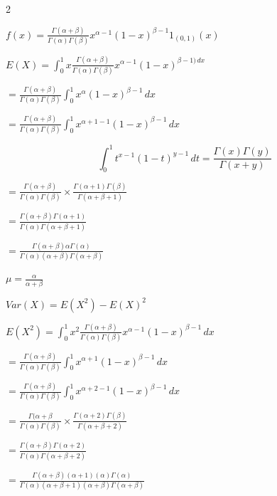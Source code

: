 \documentclass[12 pt]{article}
\begin{document}
    \begin{exercise}{2}
    \hfill

    $f(x) = \frac{\Gamma(\alpha + \beta)}{\Gamma(\alpha) \Gamma(\beta)} x^{\alpha - 1} (1-x)^{\beta - 1} 1_{(0, 1)} (x)$

    $E(X) = \int_{0}^{1} x \frac{\Gamma(\alpha + \beta)}{\Gamma(\alpha) \Gamma(\beta)} x^{\alpha - 1} (1-x)^{\beta - 1) \, dx}$

    $= \frac{\Gamma(\alpha + \beta)}{\Gamma(\alpha) \Gamma(\beta)} \int_{0}^{1} x^{\alpha} (1-x)^{\beta - 1} \, dx$

    $= \frac{\Gamma(\alpha + \beta)}{\Gamma(\alpha) \Gamma(\beta)} \int_{0}^{1} x^{\alpha + 1 - 1} (1-x)^{\beta - 1} \, dx$

    $$\int_{0}^{1} t^{x-1} (1-t)^{y-1} \, dt = \frac{\Gamma(x) \Gamma(y)}{\Gamma(x + y)}$$

    $= \frac{\Gamma(\alpha + \beta)}{\Gamma(\alpha) \Gamma(\beta)} \times \frac{\Gamma(\alpha + 1) \Gamma(\beta)}{\Gamma(\alpha + \beta + 1)}$

    $= \frac{\Gamma(\alpha + \beta) \Gamma(\alpha + 1)}{\Gamma(\alpha) \Gamma(\alpha + \beta + 1)}$

    $= \frac{\Gamma(\alpha + \beta) \alpha \Gamma(\alpha)}{\Gamma(\alpha) (\alpha + \beta) \Gamma(\alpha + \beta)}$

    $\mu = \frac{\alpha}{\alpha + \beta}$

    \hfill

    $Var(X) = E(X^2) - E(X)^2$

    \hfill

    $E(X^2) = \int_{0}^{1} x^2 \frac{\Gamma(\alpha + \beta)}{\Gamma(\alpha) \Gamma(\beta)} x^{\alpha - 1} (1-x)^{\beta -1} \, dx$

    $= \frac{\Gamma(\alpha + \beta)}{\Gamma(\alpha) \Gamma(\beta)} \int_{0}^{1} x^{\alpha + 1} (1-x)^{\beta - 1} \, dx$

    $= \frac{\Gamma(\alpha + \beta)}{\Gamma(\alpha) \Gamma(\beta)} \int_{0}^{1} x^{\alpha + 2 - 1} (1-x)^{\beta - 1} \, dx$

    $= \frac{\Gamma(\alpha + \beta}{\Gamma(\alpha) \Gamma(\beta)} \times \frac{\Gamma(\alpha + 2) \Gamma(\beta)}{\Gamma(\alpha + \beta + 2)}$

    $= \frac{\Gamma(\alpha + \beta) \Gamma(\alpha + 2)}{\Gamma(\alpha) \Gamma(\alpha + \beta + 2)}$

    $= \frac{\Gamma(\alpha + \beta) (\alpha + 1) (\alpha) \Gamma(\alpha)}{\Gamma(\alpha) (\alpha + \beta + 1)(\alpha + \beta) \Gamma(\alpha + \beta)}$


\end{exercise}
\end{document}
